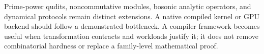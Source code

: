 Prime-power qudits, noncommutative modules, bosonic analytic operators,
and dynamical protocols remain distinct extensions. A native compiled
kernel or GPU backend should follow a demonstrated bottleneck. A compiler
framework becomes useful when transformation contracts and workloads
justify it; it does not remove combinatorial hardness or replace a
family-level mathematical proof.
